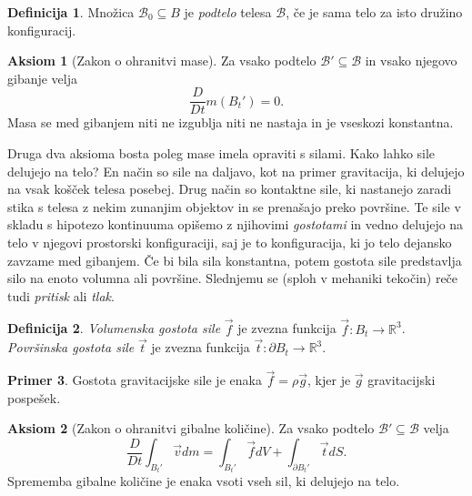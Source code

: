 \documentclass[12pt,a4paper,twoside]{article}
\theoremstyle{definition} %
\newtheorem{definicija}{Definicija}[section]
\newtheorem{primer}[definicija]{Primer}
\newtheorem{aksiom}{Aksiom}
\theoremstyle{plain} %
\numberwithin{equation}{section}
\newcommand{\R}{\mathbb R}
\newcommand{\B}{\mathcal{B}}
\newcommand{\DD}[2]{\ensuremath{\frac{D #1}{D #2}}}
\newcommand{\DDt}[1]{\DD{#1}{t}}
\newcommand{\vv}{\vec{v}}
\newcommand{\vt}{\vec{t}}
\newcommand{\vf}{\vec{f}}
\begin{document}
\begin{definicija}
  Množica $\B_0 \subseteq B$ je \emph{podtelo} telesa $\B$, če je sama telo za isto družino
  konfiguracij.
\end{definicija}

\begin{aksiom}[Zakon o ohranitvi mase]
  \label{aks:masa}
  Za vsako podtelo $\B' \subseteq  \B$ in vsako njegovo gibanje velja
  \begin{equation}
  \DDt{}m(B_t') = 0.
    \label{eq:masa}
  \end{equation}
  Masa se med gibanjem niti ne izgublja niti ne nastaja in je vseskozi
  konstantna.
\end{aksiom}

Druga dva aksioma bosta poleg mase imela opraviti s silami. Kako lahko sile delujejo na telo?
En način so sile na daljavo, kot na primer gravitacija, ki delujejo na vsak košček telesa posebej.
Drug način so kontaktne sile, ki nastanejo zaradi stika s telesa z nekim zunanjim objektov in se
prenašajo preko površine. Te sile v skladu s hipotezo kontinuuma opišemo z njihovimi
\emph{gostotami} in vedno delujejo na telo v njegovi prostorski konfiguraciji, saj je to
konfiguracija, ki jo telo dejansko zavzame med gibanjem. Če bi bila sila konstantna, potem gostota
sile predstavlja silo na enoto volumna ali površine. Slednjemu se (sploh v mehaniki tekočin) reče
tudi \emph{pritisk} ali \emph{tlak}.

\begin{definicija}
  \emph{Volumenska gostota sile} $\vf$ je zvezna funkcija $\vf\colon B_t\to\R^3$.
  \emph{Površinska gostota sile} $\vt$ je zvezna funkcija $\vt\colon\partial B_t\to\R^3$.
\end{definicija}
\begin{primer}
  Gostota gravitacijske sile je enaka $\vf = \rho \vec{g}$, kjer je $\vec{g}$ gravitacijski
  pospešek.
\end{primer}

\begin{aksiom}[Zakon o ohranitvi gibalne količine]
  \label{aks:gib}
  Za vsako podtelo $\B' \subseteq \B$ velja
  \begin{equation}
    \DDt{}\int_{B_t'} \vv dm = \int_{B_t'} \vf dV + \int_{\partial B_t'} \vec t dS.
    \label{eq:gib}
  \end{equation}
  Sprememba gibalne količine je enaka vsoti vseh sil, ki delujejo na telo.
\end{aksiom}
\end{document}
